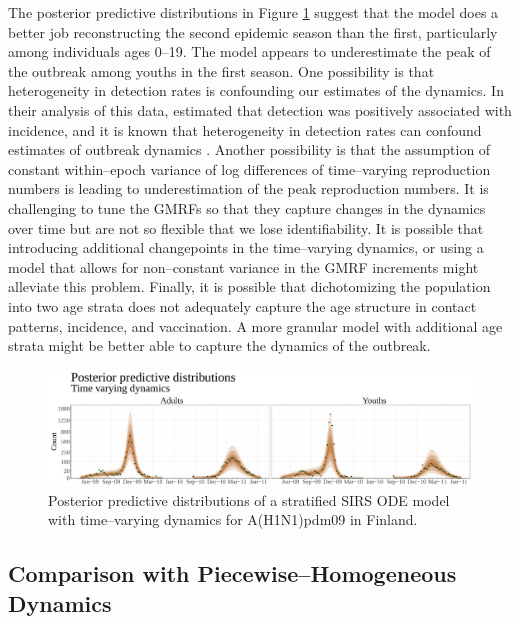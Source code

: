 The posterior predictive distributions in Figure \ref{fig:flupostpredsrwode} suggest that the model does a better job reconstructing the second epidemic season than the first, particularly among individuals ages 0--19. The model appears to underestimate the peak of the outbreak among youths in the first season. One possibility is that heterogeneity in detection rates is confounding our estimates of the dynamics. In their analysis of this data, \cite{shubin2016revealing} estimated that detection was positively associated with incidence, and it is known that heterogeneity in detection rates can confound estimates of outbreak dynamics \cite{caley2008quantifying,glass2011estimating,white2010reporting}. Another possibility is that the assumption of constant within--epoch variance of log differences of time--varying reproduction numbers is leading to underestimation of the peak reproduction numbers. It is challenging to tune the GMRFs so that they capture changes in the dynamics over time but are not so flexible that we lose identifiability. It is possible that introducing additional changepoints in the time--varying dynamics, or using a model that allows for non--constant variance in the GMRF increments might alleviate this problem. Finally, it is possible that dichotomizing the population into two age strata does not adequately capture the age structure in contact patterns, incidence, and vaccination. A more granular model with additional age strata might be better able to capture the dynamics of the outbreak.

\begin{figure}[htbp]
	\centering
	\includegraphics[width=\linewidth]{figures/flu_postpreds_rw_ode}
	\caption{Posterior predictive distributions of a stratified SIRS ODE model with time--varying dynamics for A(H1N1)pdm09 in Finland.}
	\label{fig:flupostpredsrwode}
\end{figure}

\subsection{Comparison with Piecewise--Homogeneous Dynamics}
\label{subsec:flu_res_homog}

